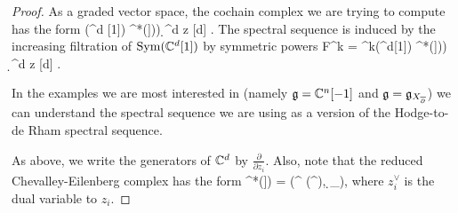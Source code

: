 \begin{proof}
As a graded vector space, the cochain complex we are trying to compute has the form
\beqn
\Sym(\CC^d [1]) \tensor \cred^*\left(\fg[[z_1,\ldots,z_d]])\right) \d^d z [d] .
\eeqn
The spectral sequence is induced by the increasing filtration of ${\rm Sym}(\mathbb C^d [1])$ by symmetric powers
\beqn
F^k = \Sym^{\leq k}(\CC^d[1]) \tensor \cred^*\left(\fg[[z_1,\ldots,z_d]])\right) \d^d z [d] .
\eeqn

\begin{rmk}
In the examples we are most interested in (namely $\mathfrak g = \mathbb C^n[-1]$ and $\mathfrak g = \mathfrak g_{X_{\overline{\partial}}}$) we can understand the spectral sequence we are using as a version of the Hodge-to-de Rham spectral sequence.
\end{rmk}

As above, we write the generators of $\mathbb C^d$ by $\frac{\partial}{\partial z_i}$. 
Also, note that the reduced Chevalley-Eilenberg complex has the form
\beqn
\cred^*(\fg[[z_1,\ldots,z_n]]) = \left(\Sym^{} \left(\fg^ \right), \d_{\fg}\right),
\eeqn
where $z_i^\vee$ is the dual variable to $z_i$. 


\end{proof}

